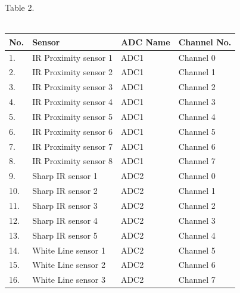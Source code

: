 \documentclass[a4paper,12pt,oneside]{book}
\begin{document}
\hspace{7cm}Table 2.\\\\
\begin{tabular}{|p{2cm}|p{5cm}|p{2cm}|p{5cm}|}
	\hline
	\textbf{No.} &\textbf{Sensor} & \textbf{ADC Name} & \textbf{Channel No.}\\ [0.5ex] 
	\hline
	1. & IR Proximity sensor 1 & ADC1 & Channel 0  \\ 
	\hline
	2. & IR Proximity sensor 2 & ADC1 & Channel 1  \\ 
	\hline
	3. & IR Proximity sensor 3 & ADC1 & Channel 2 \\ 
	\hline
	4. & IR Proximity sensor 4 & ADC1 & Channel 3 \\ 
   \hline
	5. & IR Proximity sensor 5 & ADC1 & Channel 4  \\ 
   \hline
	6. & IR Proximity sensor 6 & ADC1 & Channel 5  \\ 
  \hline
	7. & IR Proximity sensor 7 & ADC1 & Channel 6  \\ 
  \hline
  	8. & IR Proximity sensor 8 & ADC1 & Channel 7  \\ 
  \hline
  	9. & Sharp IR sensor 1 & ADC2 & Channel 0  \\ 
  \hline
  	10. & Sharp IR sensor 2 & ADC2 & Channel 1  \\ 
  \hline
  	11. & Sharp IR sensor 3 & ADC2 & Channel 2  \\ 
  \hline
  	12. & Sharp IR sensor 4 & ADC2 & Channel 3  \\ 
  \hline
  	13. & Sharp IR sensor 5 & ADC2 & Channel 4  \\ 
  \hline
  	14. & White Line sensor 1 & ADC2 & Channel 5  \\ 
  \hline
	15. & White Line sensor 2 & ADC2 & Channel 6  \\ 
\hline
	16. & White Line sensor 3 & ADC2 & Channel 7  \\ 
\hline
	
\end{tabular}
\pagebreak
\end{document}
